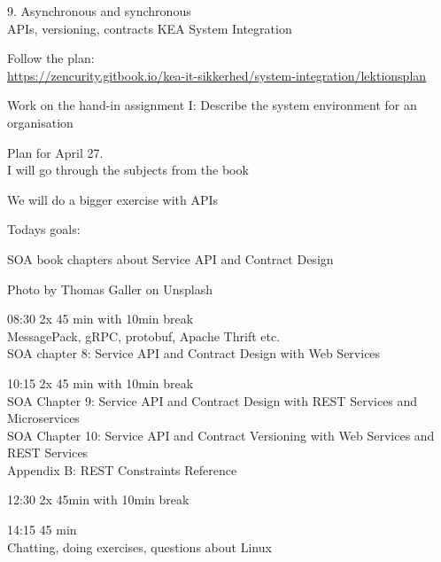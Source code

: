 \documentclass[Screen16to9,17pt]{foils}
\begin{document}
\mytitlepage
{9. Asynchronous and synchronous\\
 APIs, versioning, contracts}
{KEA System Integration}



\begin{list2}
\item Follow the plan:\\
\url{https://zencurity.gitbook.io/kea-it-sikkerhed/system-integration/lektionsplan}
\item Work on the hand-in assignment I: Describe the system environment for an organisation
\item Plan for April 27.\\
I will go through the subjects from the book
\item We will do a bigger exercise with APIs
\end{list2}



Todays goals:
\begin{list2}
\item SOA book chapters about Service API and Contract Design
\end{list2}

Photo by Thomas Galler on Unsplash


\begin{list2}
\item 08:30 2x 45 min with 10min break\\
MessagePack, gRPC, protobuf, Apache Thrift etc.\\
SOA chapter 8: Service API and Contract Design
with Web Services
\item 10:15 2x 45 min with 10min break\\
SOA Chapter 9: Service API and Contract Design with
REST Services and Microservices\\
SOA Chapter 10: Service API and Contract Versioning
with Web Services and REST Services\\
Appendix B: REST Constraints Reference
\item 12:30 2x 45min with 10min break \\

\item 14:15 45 min\\
Chatting, doing exercises, questions about Linux
\end{list2}
\end{document}
